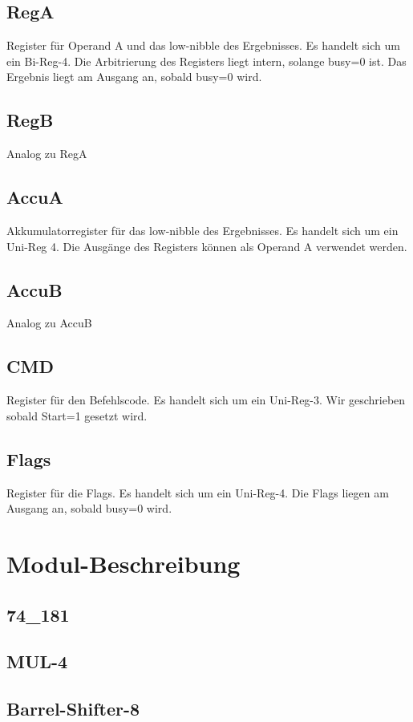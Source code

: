 \documentclass[11pt]{report}
\begin{document}
	\subsection{RegA}
	Register für Operand A und das low-nibble des Ergebnisses.
	Es handelt sich um ein Bi-Reg-4.
	Die Arbitrierung des Registers liegt intern, solange busy=0 ist.
	Das Ergebnis liegt am Ausgang an, sobald busy=0 wird.
	
	\subsection{RegB}
	Analog zu RegA
	
	\subsection{AccuA}
	Akkumulatorregister für das low-nibble des Ergebnisses.
	Es handelt sich um ein Uni-Reg 4.
	Die Ausgänge des Registers können als Operand A verwendet werden.
	
	\subsection{AccuB}
	Analog zu AccuB
	
	\subsection{CMD}
	Register für den Befehlscode.
	Es handelt sich um ein Uni-Reg-3. Wir geschrieben sobald Start=1 gesetzt wird.
	
	\subsection{Flags}
	Register für die Flags.
	Es handelt sich um ein Uni-Reg-4.
	Die Flags liegen am Ausgang an, sobald busy=0 wird.
	
	
	\section{Modul-Beschreibung}
	\subsection{74\_181}
	\subsection{MUL-4}
	\subsection{Barrel-Shifter-8}
\end{document}
